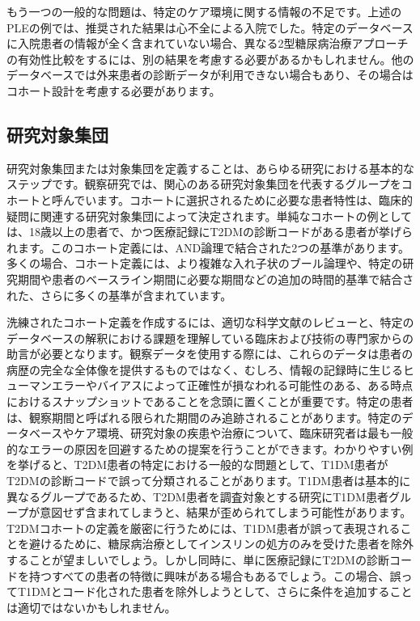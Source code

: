\documentclass[
  11pt]{book}
\theoremstyle{definition}
\theoremstyle{definition}
\theoremstyle{definition}
\theoremstyle{definition}
\theoremstyle{remark}
\begin{document}
もう一つの一般的な問題は、特定のケア環境に関する情報の不足です。上述のPLEの例では、推奨された結果は心不全による入院でした。特定のデータベースに入院患者の情報が全く含まれていない場合、異なる2型糖尿病治療アプローチの有効性比較をするには、別の結果を考慮する必要があるかもしれません。他のデータベースでは外来患者の診断データが利用できない場合もあり、その場合はコホート設計を考慮する必要があります。

\subsection{研究対象集団}\label{ux7814ux7a76ux5bfeux8c61ux96c6ux56e3}

研究対象集団または対象集団を定義することは、あらゆる研究における基本的なステップです。観察研究では、関心のある研究対象集団を代表するグループをコホートと呼んでいます。コホートに選択されるために必要な患者特性は、臨床的疑問に関連する研究対象集団によって決定されます。単純なコホートの例としては、18歳以上の患者で、かつ医療記録にT2DMの診断コードがある患者が挙げられます。このコホート定義には、AND論理で結合された2つの基準があります。多くの場合、コホート定義には、より複雑な入れ子状のブール論理や、特定の研究期間や患者のベースライン期間に必要な期間などの追加の時間的基準で結合された、さらに多くの基準が含まれています。

洗練されたコホート定義を作成するには、適切な科学文献のレビューと、特定のデータベースの解釈における課題を理解している臨床および技術の専門家からの助言が必要となります。観察データを使用する際には、これらのデータは患者の病歴の完全な全体像を提供するものではなく、むしろ、情報の記録時に生じるヒューマンエラーやバイアスによって正確性が損なわれる可能性のある、ある時点におけるスナップショットであることを念頭に置くことが重要です。特定の患者は、観察期間と呼ばれる限られた期間のみ追跡されることがあります。特定のデータベースやケア環境、研究対象の疾患や治療について、臨床研究者は最も一般的なエラーの原因を回避するための提案を行うことができます。わかりやすい例を挙げると、T2DM患者の特定における一般的な問題として、T1DM患者がT2DMの診断コードで誤って分類されることがあります。T1DM患者は基本的に異なるグループであるため、T2DM患者を調査対象とする研究にT1DM患者グループが意図せず含まれてしまうと、結果が歪められてしまう可能性があります。T2DMコホートの定義を厳密に行うためには、T1DM患者が誤って表現されることを避けるために、糖尿病治療としてインスリンの処方のみを受けた患者を除外することが望ましいでしょう。しかし同時に、単に医療記録にT2DMの診断コードを持つすべての患者の特徴に興味がある場合もあるでしょう。この場合、誤ってT1DMとコード化された患者を除外しようとして、さらに条件を追加することは適切ではないかもしれません。
\end{document}
